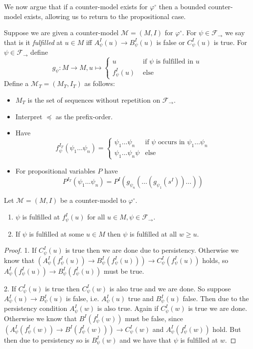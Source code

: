 \documentclass[a4paper,UKenglish,cleveref, autoref, thm-restate]{lipics-v2021}
\begin{document}
We now argue that if a counter-model exists for $\varphi^\circ$ then a bounded counter-model exists, allowing us to return to the propositional case.

\begin{definition}
	Suppose we are given a counter-model $\mathcal M = (M, I)$ for $\varphi^\circ$. For $\psi\in\mathcal F_\to$ we say that is it \textit{fulfilled} at $u\in M$ iff $A_\psi^I(u)\to B_\psi^I(u)$ is false or $C_\psi^I(u)$ is true. For $\psi\in\mathcal F_\to$ define $$g_\psi : M\to M, u\mapsto\begin{cases}
		u&\text{ if $\psi$ is fulfilled in $u$}\\
		f^I_\psi(u)&\text{ else}		
	\end{cases}$$Define a $\mathcal M_T = (M_T, I_T)$ as follows:
	\begin{itemize}
		\item $M_T$ is the set of sequences without repetition on $\mathcal F_\to$.
		\item Interpret $\preceq$ as the prefix-order.
		\item Have $$f_\psi^{I_T}(\psi_1\dots\psi_n) = \begin{cases}
			\psi_1\dots\psi_n&\text{if $\psi$ occurs in $\psi_1\dots\psi_n$}\\
			\psi_1\dots\psi_n\psi&\text{else}			
		\end{cases}$$
		\item For propositional variables $P$ have $$P^{I_T}(\psi_1\dots \psi_n) = P^I(g_{\psi_n}(\dots(g_{\psi_1}(s^I))\dots))$$
	\end{itemize}
\end{definition}
\begin{lemma}
	Let $\mathcal M = (M, I)$ be a counter-model to $\mathcal \varphi^\circ$.
	\begin{enumerate}
		\item $\psi$ is fulfilled at $f_\psi^I(u)$ for all $u\in M, \psi\in\mathcal F_\to$.
		\item If $\psi$ is fulfilled at some $u\in M$ then $\psi$ is fulfilled at all $w\geq u$.
	\end{enumerate}
	
\end{lemma}

\begin{proof}
	1. If $C_\psi^I(u)$ is true then we are done due to persistency. Otherwise we know that $(A_\psi^I(f_\psi^I(u))\to B_\psi^I(f_\psi^I(u)))\to C_\psi^I(f_\psi^I(u))$ holds, so $A_\psi^I(f_\psi^I(u))\to B_\psi^I(f_\psi^I(u))$ must be true.
	
	2. If $C_\psi^I(u)$ is true then $C_\psi^I(w)$ is also true and we are done. So suppose $A_\psi^I(u)\to B_\psi^I(u)$ is false, i.e. $A_\psi^I(u)$ true and $B_\psi^I(u)$ false. Then due to the persistency condition $A_\psi^I(w)$ is also true. Again if $C_\psi^I(w)$ is true we are done. Otherwise we know that $B^I(f^I_\psi(w))$ must be false, since $(A^I_\psi(f^I_\psi(w))\to B^I(f^I_\psi(w)))\to C^I_\psi(w)$ and $A^I_\psi(f^I_\psi(w))$ hold. But then due to persistency so is $B^I_\psi(w)$ and we have that $\psi$ is fulfilled at $w$.
\end{proof}
\end{document}
